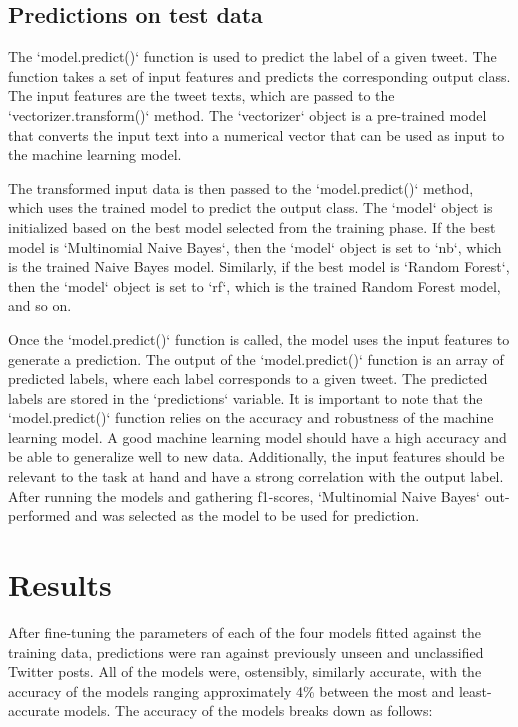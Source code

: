 \documentclass[11pt]{diazessay} %
\begin{document}
\subsection{Predictions on test data}

The `model.predict()` function is used to predict the label of a given tweet. The function takes a set of input features and predicts the corresponding output class. The input features are the tweet texts, which are passed to the `vectorizer.transform()` method. The `vectorizer` object is a pre-trained model that converts the input text into a numerical vector that can be used as input to the machine learning model.

The transformed input data is then passed to the `model.predict()` method, which uses the trained model to predict the output class. The `model` object is initialized based on the best model selected from the training phase. If the best model is `Multinomial Naive Bayes`, then the `model` object is set to `nb`, which is the trained Naive Bayes model. Similarly, if the best model is `Random Forest`, then the `model` object is set to `rf`, which is the trained Random Forest model, and so on.

Once the `model.predict()` function is called, the model uses the input features to generate a prediction. The output of the `model.predict()` function is an array of predicted labels, where each label corresponds to a given tweet. The predicted labels are stored in the `predictions` variable. It is important to note that the `model.predict()` function relies on the accuracy and robustness of the machine learning model. A good machine learning model should have a high accuracy and be able to generalize well to new data. Additionally, the input features should be relevant to the task at hand and have a strong correlation with the output label. After running the models and gathering f1-scores, `Multinomial Naive Bayes` out-performed and was selected as the model to be used for prediction.


\section{Results}


After fine-tuning the parameters of each of the four models fitted against the training data, predictions were ran against previously unseen and unclassified Twitter posts. All of the models were, ostensibly, similarly accurate, with the accuracy of the models ranging approximately 4\% between the most and least-accurate models. The accuracy of the models breaks down as follows:
\end{document}
